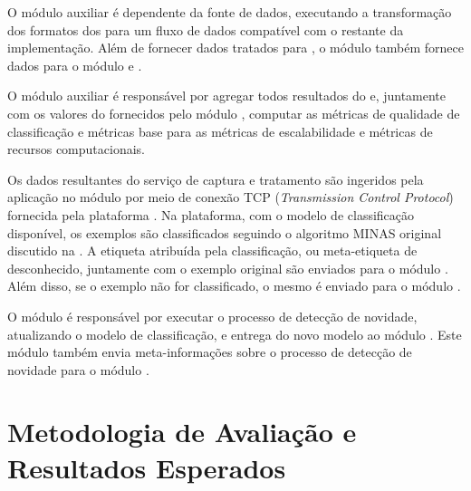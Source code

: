 O módulo auxiliar \source é dependente da fonte de dados, executando a transformação dos
formatos dos \datasets para um fluxo de dados compatível com o restante da
implementação.
Além de fornecer dados tratados para \mfog, o módulo \source também fornece
dados para o módulo \sink e \offline.

O módulo auxiliar \sink é responsável por agregar todos resultados do \mfog e,
juntamente com os valores do \dataset fornecidos pelo módulo \source, computar
as métricas de qualidade de classificação e métricas base para as métricas de
escalabilidade e métricas de recursos computacionais.

Os dados resultantes do serviço de captura e tratamento são ingeridos pela
aplicação no módulo \classify por meio de conexão TCP (\emph{Transmission
Control Protocol}) fornecida pela plataforma \flink.
Na plataforma, com o modelo de classificação disponível, os exemplos são
classificados seguindo o algoritmo MINAS original discutido na .
A etiqueta atribuída pela classificação, ou meta-etiqueta de desconhecido,
juntamente com o exemplo original são enviados para o módulo \sink.
Além disso, se o exemplo não for classificado, o mesmo é enviado para o módulo
\detector.

O módulo \detector é responsável por executar o processo de detecção de
novidade, atualizando o modelo de classificação, e entrega do novo modelo
ao módulo \classify.
Este módulo também envia meta-informações sobre o processo de detecção de
novidade para o módulo \sink.




\section{Metodologia de Avaliação e Resultados Esperados}\label{sec:esperados}


